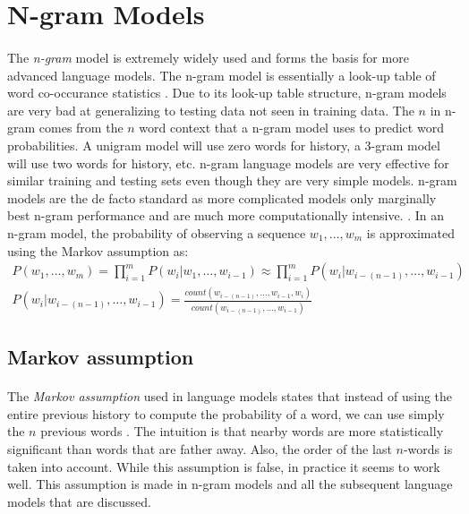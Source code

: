 \documentclass[12pt]{ociamthesis}
\begin{document}
\section{N-gram Models}
\paragraph{}
The \emph{n-gram} model is extremely widely used and forms the basis for more advanced language models. The n-gram model is essentially a look-up table of word co-occurance statistics \cite{Jurafsky2009}. Due to its look-up table structure, n-gram models are very bad at generalizing to testing data not seen in training data. The $n$ in n-gram comes from the $n$ word context that a n-gram model uses to predict word probabilities. A unigram model will use zero words for history, a 3-gram model will use two words for history, etc. n-gram language models are very effective for similar training and testing sets even though they are very simple models. n-gram models are the de facto standard as more complicated models only marginally best n-gram performance and are much more computationally intensive. \cite{Mikolav2012}. 
In an n-gram model, the probability of observing a sequence $w_1, \dots, w_m$ is approximated using the Markov assumption as:
\begin{align}
P(w_1,\dots,w_m) = \prod^{m}_{i=1} P(w_i|w_1,\dots, w_{i-1}) \approx  \prod^{m}_{i=1} P(w_i | w_{i-(n-1)},\dots, w_{i-1}) 
\\P(w_i | w_{i-(n-1)},\dots, w_{i-1}) = \frac{count(w_{i-(n-1)},\dots,w_{i-1},w_i)}{count(w_{i-(n-1)},\dots,w_{i-1})}
\end{align}
\subsection{Markov assumption}
\paragraph{}
The \emph{Markov assumption} used in language models states that instead of using the entire previous history to compute the probability of a word, we can use simply the $n$ previous words \cite{Jurafsky2009}. The intuition is that nearby words are more statistically significant than words that are father away. Also, the order of the last $n$-words is taken into account. While this assumption is false, in practice it seems to work well. This assumption is made in n-gram models and all the subsequent language models that are discussed.
\end{document}
